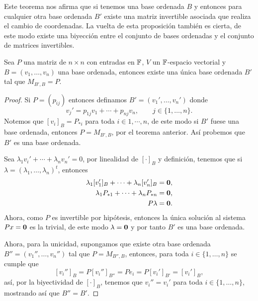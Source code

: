 Este teorema nos afirma que si tenemos una base ordenada $B$ y entonces para cualquier otra base ordenada $B'$ existe una matriz invertible asociada que realiza el cambio de coordenadas. La vuelta de esta proposición también es cierta, de este modo existe una biyección entre el conjunto de bases ordenadas y el conjunto de matrices invertibles.

\begin{prop}\label{prop:ExBase}
  Sea $P$ una matriz de $n\times n$ con entradas en $\mathbb{F}$, $V$ un $\mathbb{F}$-espacio vectorial y $B = (v_1, \ldots, v_n)$ una base ordenada, entonces existe una única base ordenada $B'$ tal que $M_{B',B} = P$.
\end{prop}
\begin{proof}
  Si $P = (p_{ij})$ entonces definamos $B' = (v_1', \ldots, v_n')$ donde
    \[ v_j' = p_{1j}v_1 + \cdots +  p_{nj}v_n,     \qquad j \in \{1,\ldots, n\}. \]
  Notemos que $[v_i]_B = P_{*i}$ para toda $i \in 1,\cdots,n$, de este modo si $B'$ fuese una base ordenada, entonces $P = M_{B',B}$, por el teorema anterior. Así probemos que $B'$ es una base ordenada.

  Sea $\lambda_1 v_i' + \cdots + \lambda_n v_n' = 0$, por linealidad de $[\cdot]_B$ y definición, tenemos que si $\lambda = (\lambda_1, \ldots, \lambda_n)^t$, entonces
  \begin{align*}
    \lambda_1 [v_1']_B + \cdots + \lambda_n [v_n']_B &= \mathbf{0} ,\\
    \lambda_1 P_{*1} + \cdots + \lambda_n P_{*n} &= \mathbf{0} ,\\
    P\lambda &= \mathbf{0}.
  \end{align*}
  Ahora, como $P$ es invertible por hipótesis, entonces la única solución al sistema $Px = \mathbf{0}$ es la trivial, de este modo $\lambda = \mathbf{0}$ y por tanto $B'$ es una base ordenada.

  Ahora, para la unicidad, supongamos que existe otra base ordenada $B'' = (v_1'', \ldots, v_n'')$ tal que $P = M_{B'',B}$, entonces, para toda $i \in \{1,\ldots,n\}$ se cumple que
  \[ [v_i'']_B =  P[v_i'']_{B''} = Pe_i = P[v_i']_{B'} = [v_i']_B, \]
  así, por la biyectividad de $[\cdot]_B$, tenemos que $v_i'' = v_i'$ para toda $i \in \{1,\ldots,n\}$, mostrando así que $B'' = B'$.
\end{proof}

